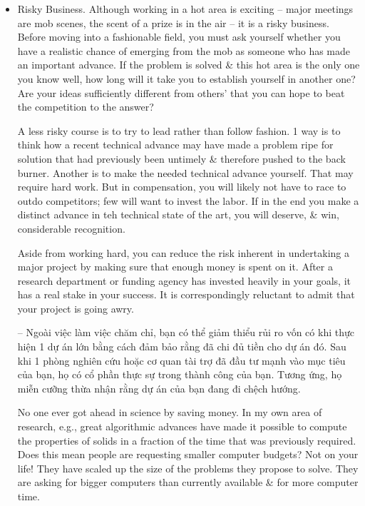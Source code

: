 \documentclass{article}
\begin{document}
\begin{enumerate}
\begin{itemize}
\begin{itemize}
			For this reason, it is important for you to start thinking up, working on, \& publishing the results of projects where you are the sole author or perhaps the only theorist in collaboration with an experimental group. In the latter case, it is not enough just to act as the house theorist, the data analyst who performed regressions on demand. You must perceptibly contribute new ideas -- ones that your experimental colleagues would be unlikely to have produced on their own.
			\item {\sf Risky Business.} Although working in a hot area is exciting -- major meetings are mob scenes, the scent of a prize is in the air -- it is a risky business. Before moving into a fashionable field, you must ask yourself whether you have a realistic chance of emerging from the mob as someone who has made an important advance. If the problem is solved \& this hot area is the only one you know well, how long will it take you to establish yourself in another one? Are your ideas sufficiently different from others' that you can hope to beat the competition to the answer?

			A less risky course is to try to lead rather than follow fashion. 1 way is to think how a recent technical advance may have made a problem ripe for solution that had previously been untimely \& therefore pushed to the back burner. Another is to make the needed technical advance yourself. That may require hard work. But in compensation, you will likely not have to race to outdo competitors; few will want to invest the labor. If in the end you make a distinct advance in teh technical state of the art, you will deserve, \& win, considerable recognition.

			Aside from working hard, you can reduce the risk inherent in undertaking a major project by making sure that enough money is spent on it. After a research department or funding agency has invested heavily in your goals, it has a real stake in your success. It is correspondingly reluctant to admit that your project is going awry.

			-- Ngoài việc làm việc chăm chỉ, bạn có thể giảm thiểu rủi ro vốn có khi thực hiện 1 dự án lớn bằng cách đảm bảo rằng đã chi đủ tiền cho dự án đó. Sau khi 1 phòng nghiên cứu hoặc cơ quan tài trợ đã đầu tư mạnh vào mục tiêu của bạn, họ có cổ phần thực sự trong thành công của bạn. Tương ứng, họ miễn cưỡng thừa nhận rằng dự án của bạn đang đi chệch hướng.

			No one ever got ahead in science by saving money. In my own area of research, e.g., great algorithmic advances have made it possible to compute the properties of solids in a fraction of the time that was previously required. Does this mean people are requesting smaller computer budgets? Not on your life! They have scaled up the size of the problems they propose to solve. They are asking for bigger computers than currently available \& for more computer time.


\end{itemize}
\end{itemize}
\end{enumerate}
\end{document}

